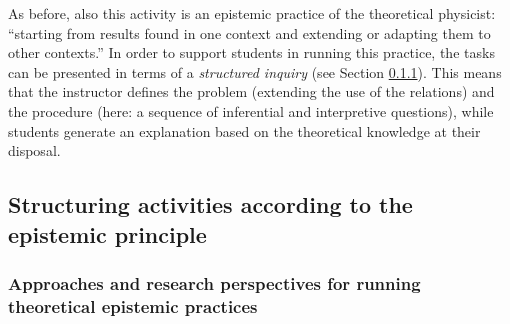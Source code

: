 \documentclass[twocolumn,secnumarabic,amssymb, nobibnotes, aps, prd, nofootinbib]{revtex4-2}
\begin{document}
As before, also this activity is an epistemic practice of the theoretical physicist: ``starting from results found in one context and extending or adapting them to other contexts.'' In order to support students in running this practice, the tasks can be presented in terms of a \emph{structured inquiry} (see Section \ref{Sec:3.4.1}). This means that the instructor defines the problem (extending the use of the relations) and the procedure (here: a sequence of inferential and interpretive questions), while students generate an explanation based on the theoretical knowledge at their disposal.

\subsection{Structuring activities according to the epistemic principle}  \label{Sec:3.4}

\subsubsection{Approaches and research perspectives for running theoretical epistemic practices} \label{Sec:3.4.1}
\end{document}
